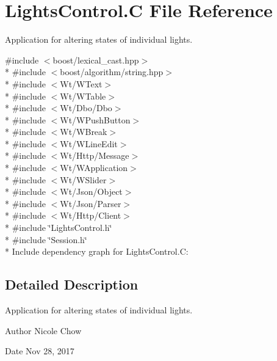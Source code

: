 \hypertarget{LightsControl_8C}{}\section{Lights\+Control.\+C File Reference}
\label{LightsControl_8C}


Application for altering states of individual lights.  


{\ttfamily \#include $<$boost/lexical\+\_\+cast.\+hpp$>$}\\*
{\ttfamily \#include $<$boost/algorithm/string.\+hpp$>$}\\*
{\ttfamily \#include $<$Wt/\+W\+Text$>$}\\*
{\ttfamily \#include $<$Wt/\+W\+Table$>$}\\*
{\ttfamily \#include $<$Wt/\+Dbo/\+Dbo$>$}\\*
{\ttfamily \#include $<$Wt/\+W\+Push\+Button$>$}\\*
{\ttfamily \#include $<$Wt/\+W\+Break$>$}\\*
{\ttfamily \#include $<$Wt/\+W\+Line\+Edit$>$}\\*
{\ttfamily \#include $<$Wt/\+Http/\+Message$>$}\\*
{\ttfamily \#include $<$Wt/\+W\+Application$>$}\\*
{\ttfamily \#include $<$Wt/\+W\+Slider$>$}\\*
{\ttfamily \#include $<$Wt/\+Json/\+Object$>$}\\*
{\ttfamily \#include $<$Wt/\+Json/\+Parser$>$}\\*
{\ttfamily \#include $<$Wt/\+Http/\+Client$>$}\\*
{\ttfamily \#include \char`\"{}Lights\+Control.\+h\char`\"{}}\\*
{\ttfamily \#include \char`\"{}Session.\+h\char`\"{}}\\*
Include dependency graph for Lights\+Control.\+C\+:


\subsection{Detailed Description}
Application for altering states of individual lights. 

\begin{DoxyAuthor}{Author}
Nicole Chow 
\end{DoxyAuthor}
\begin{DoxyDate}{Date}
Nov 28, 2017 
\end{DoxyDate}
